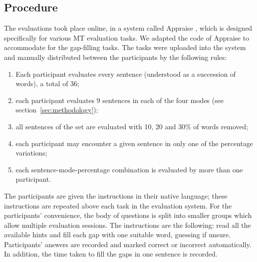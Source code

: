 \documentclass[11pt]{article}
\begin{document}
\subsection{Procedure}

The evaluations took place online, in a system called Appraise \citep{federmann12}, which is 
designed specifically for various MT evaluation tasks. We adapted the code of Appraise to 
accommodate for the gap-filling tasks. The tasks were uploaded into the system and 
manually distributed between the participants by the following rules:
\begin{enumerate}\itemsep 0ex
\item  Each participant evaluates every sentence (understood as a succession of words),
a total of 36;
\item  each participant evaluates 9 sentences in each of the four modes (see section~\ref{sec:methodology});
\item  all sentences of the set are evaluated with 10, 20 and 30\% of words removed;
\item each participant may encounter a given sentence in only one of the percentage variations;
\item  each sentence-mode-percentage combination is evaluated by more than one participant.
\end{enumerate}


The participants are given the instructions in their native language; these instructions are repeated above each task in the evaluation system. For the participants' convenience, the body of questions is split into smaller groups which allow multiple evaluation sessions. The instructions are the 
following: read all the available hints and fill each gap with one suitable word, guessing if unsure.
Participants' answers are recorded and marked correct or incorrect automatically. In
addition, the time taken to fill the gaps in one sentence is recorded.
\end{document}
